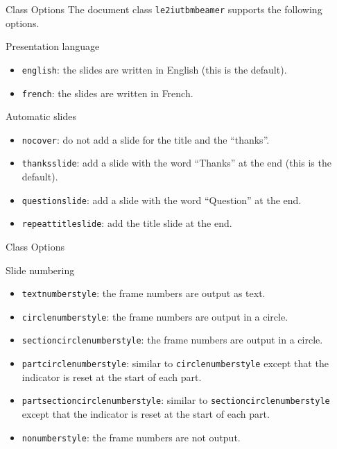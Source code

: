 \documentclass[english,sectioncirclenumberstyle]{le2iutbmbeamer}
\begin{document}
\begin{frame}[t]{Class Options}
	The document class \texttt{le2iutbmbeamer} supports the following options.
	\begin{block}{Presentation language}
		\begin{itemize}
		\item \texttt{english}: the slides are written in English (this is the default).
		\item \texttt{french}: the slides are written in French.
		\end{itemize}
	\end{block}
	\begin{block}{Automatic slides}
		\begin{itemize}
		\item \texttt{nocover}: do not add a slide for the title and the ``thanks''.
		\item \texttt{thanksslide}: add a slide with the word ``Thanks'' at the end (this is the default). 
		\item \texttt{questionslide}: add a slide with the word ``Question'' at the end. 
		\item \texttt{repeattitleslide}: add the title slide at the end.
		\end{itemize}
	\end{block}
\end{frame}

\begin{frame}[t]{Class Options \insertcontinuationtext}
	\begin{block}{Slide numbering}
		\begin{itemize}
		\item \texttt{textnumberstyle}: the frame numbers are output as text.\hfill\hyperlink{progressbartypes}{}
		\item \texttt{circlenumberstyle}: the frame numbers are output in a circle.\hfill\hyperlink{progressbartypes}{}
		\item \texttt{sectioncirclenumberstyle}: the frame numbers are output in a circle.\hfill\hyperlink{progressbartypes}{}
		\item \texttt{partcirclenumberstyle}: similar to \texttt{circlenumberstyle} except that the indicator is reset at the start of each part.
		\item \texttt{partsectioncirclenumberstyle}: similar to \texttt{sectioncirclenumberstyle} except that the indicator is reset at the start of each part.
		\item \texttt{nonumberstyle}: the frame numbers are not output.
		\end{itemize}
	\end{block}
\end{frame}
\end{document}
